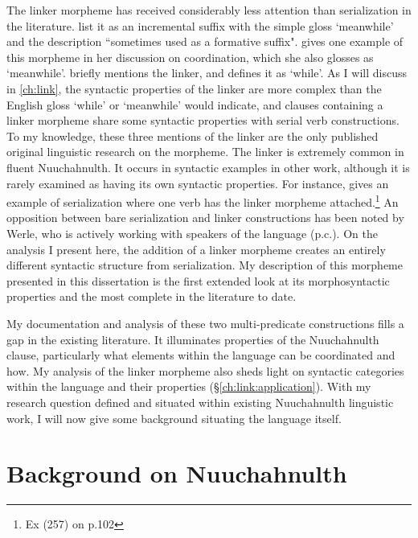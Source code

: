 The linker morpheme has received considerably less attention than serialization in the literature. \citet[p.~241]{sapir1939} list it as an incremental suffix with the simple gloss `meanwhile' and the description ``sometimes used as a formative suffix". \citet[p.~151]{rose1981} gives one example of this morpheme in her discussion on coordination, which she also glosses as `meanwhile'. \citet[p.~245]{jacobsen1993} briefly mentions the linker, and defines it as `while'. As I will discuss in \cref{ch:link}, the syntactic properties of the linker are more complex than the English gloss `while' or `meanwhile' would indicate, and clauses containing a linker morpheme share some syntactic properties with serial verb constructions. To my knowledge, these three mentions of the linker are the only published original linguistic research on the morpheme. The linker is extremely common in fluent Nuuchahnulth. It occurs in syntactic examples in other work, although it is rarely examined as having its own syntactic properties. For instance, \citet{nakayama2001} gives an example of serialization where one verb has the linker morpheme attached.\footnote{Ex (257) on p.102} An opposition between bare serialization and linker constructions has been noted by Werle, who is actively working with speakers of the language (p.c.). On the analysis I present here, the addition of a linker morpheme creates an entirely different syntactic structure from serialization. My description of this morpheme presented in this dissertation is the first extended look at its morphosyntactic properties and the most complete in the literature to date.

My documentation and analysis of these two multi-predicate constructions fills a gap in the existing literature. It illuminates properties of the Nuuchahnulth clause, particularly what elements within the language can be coordinated and how. My analysis of the linker morpheme also sheds light on syntactic categories within the language and their properties (\S\ref{ch:link:application}). With my research question defined and situated within existing Nuuchahnulth linguistic work, I will now give some background situating the language itself.

\section{Background on Nuuchahnulth} \label{ch:intro:ncn}


